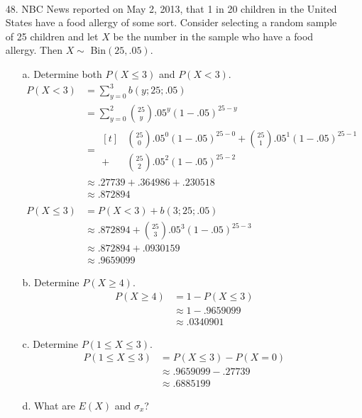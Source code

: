 \documentclass[letterpaper,12pt]{article}
\newcommand{\bp}[3]{%
  \binom{#2}{#1}#3^{#1}(1 - #3)^{#2 - #1}%
}
\begin{document}
\begin{enumerate}
\begin{enumerate}
\begin{align*}
        \end{align*}
    \end{enumerate}
  \item[48.]
    NBC News reported on May 2, 2013, that 1 in 20 children in the United States have a food allergy of some sort. Consider selecting a random sample of 25 children and let $X$ be the number in the sample who have a food allergy. Then $X \sim$ Bin$(25, .05)$.
    \begin{enumerate}
      \item[a.]
        Determine both $P(X \le 3)$ and $P(X < 3)$.
        \begin{align*}
          P(X < 3) &= \sum_{y = 0}^3 b(y; 25; .05) \\
          &= \sum_{y = 0}^2 \bp{y}{25}{.05} \\
          &= \begin{aligned}[t]
              &\bp{0}{25}{.05} + \bp{1}{25}{.05} \\
            + &\bp{2}{25}{.05}
          \end{aligned} \\
          &\approx .27739 + .364986 + .230518 \\
          &\approx .872894 \\
          \\
          P(X \le 3) &= P(X < 3) + b(3; 25; .05) \\
          &\approx .872894 + \bp{3}{25}{.05} \\
          &\approx .872894 + .0930159 \\
          &\approx .9659099
        \end{align*}
      \item[b.]
        Determine $P(X \ge 4)$.
        \begin{align*}
          P(X \ge 4) &= 1 - P(X \le 3) \\
          &\approx 1 - .9659099 \\
          &\approx .0340901
        \end{align*}
      \item[c.]
        Determine $P(1 \le X \le 3)$.
        \begin{align*}
          P(1 \le X \le 3) &= P(X \le 3) - P(X = 0) \\
          &\approx .9659099 - .27739 \\
          &\approx .6885199
        \end{align*}
      \item[d.]
        What are $E(X)$ and $\sigma_x$?

\end{enumerate}
\end{enumerate}
\end{document}
